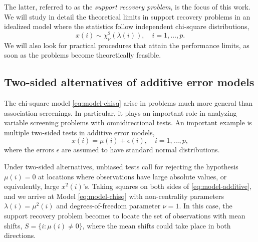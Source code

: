 The latter, referred to as the \emph{support recovery problem}, is the focus of this work.
We will study in detail the theoretical limits in support recovery problems in an idealized model where the statistics follow independent
chi-square distributions,
\begin{equation} \label{eq:model-chisq}
    x(i) \sim \chi_\nu^2\left(\lambda(i)\right), \quad i=1,\ldots,p.
\end{equation}
We will also look for practical procedures that attain the performance limits, as soon as the problems become theoretically feasible.


\subsection{Two-sided alternatives of additive error models}
\label{subsec:motivation-additive}

The chi-square model \eqref{eq:model-chisq} arise in problems much more general than association screenings.
In particular, it plays an important role in analyzing variable screening problems with omnidirectional tests.
An important example is multiple two-sided tests in additive error models,
\begin{equation} \label{eq:model-additive}
    x(i) = \mu(i) + \epsilon(i), \quad i=1,\ldots,p,
\end{equation}
where the errors $\epsilon$ are assumed to have standard normal distributions.

Under two-sided alternatives, unbiased tests call for rejecting the hypothesis $\mu(i)=0$ at locations where observations have large absolute values, or equivalently, large $x^2(i)$'s.
Taking squares on both sides of \eqref{eq:model-additive}, and we arrive at Model \eqref{eq:model-chisq} with non-centrality parameters $\lambda(i) = \mu^2(i)$ and degrees-of-freedom parameter $\nu =1$.
In this case, the support recovery problem becomes to locate the set of observations with mean shifts, $S=\{i:\mu(i)\neq 0\}$, where the mean shifts could take place in both directions.

